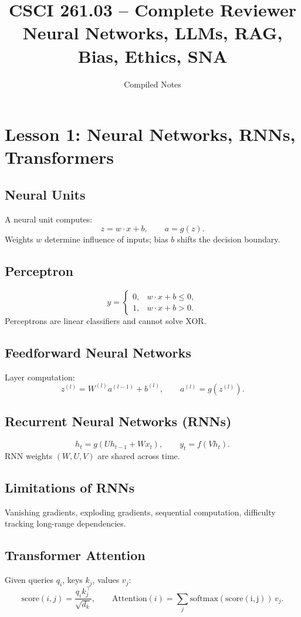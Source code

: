 \documentclass[12pt]{article}
\title{CSCI 261.03 -- Complete Reviewer\\
Neural Networks, LLMs, RAG, Bias, Ethics, SNA}
\author{Compiled Notes}
\date{}
\begin{document}
\maketitle

\section*{Lesson 1: Neural Networks, RNNs, Transformers}

\subsection*{Neural Units}
A neural unit computes:
\[
z = w \cdot x + b, \qquad a = g(z).
\]
Weights $w$ determine influence of inputs; bias $b$ shifts the decision boundary.

\subsection*{Perceptron}
\[
y =
\begin{cases}
0, & w \cdot x + b \le 0,\\[4pt]
1, & w \cdot x + b > 0.
\end{cases}
\]
Perceptrons are linear classifiers and cannot solve XOR.

\subsection*{Feedforward Neural Networks}
Layer computation:
\[
z^{(l)} = W^{(l)} a^{(l-1)} + b^{(l)}, \qquad
a^{(l)} = g(z^{(l)}).
\]

\subsection*{Recurrent Neural Networks (RNNs)}
\[
h_t = g(Uh_{t-1} + Wx_t), \qquad y_t = f(Vh_t).
\]
RNN weights $(W,U,V)$ are shared across time.

\subsection*{Limitations of RNNs}
Vanishing gradients, exploding gradients, sequential computation, difficulty tracking long-range dependencies.

\subsection*{Transformer Attention}
Given queries $q_i$, keys $k_j$, values $v_j$:
\[
\text{score}(i,j)=\frac{q_i k_j^\top}{\sqrt{d_k}}, \qquad
\text{Attention}(i)=\sum_j \mathrm{softmax(score(i,j))}\,v_j.
\]
\end{document}
